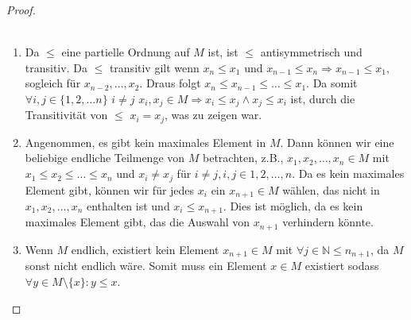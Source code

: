\documentclass{exam}
\begin{document}
\begin{proof} \\\
	\begin{enumerate}[label=\roman*)]
		\item
		      Da $\le$ eine partielle Ordnung auf $M$ ist, ist $\le$ antisymmetrisch und transitiv.
		      Da $\le$ transitiv gilt wenn $x_n \le x_1$ und $x_{n-1} \le x_n \Rightarrow x_{n-1} \le x_1$, sogleich für $x_{n-2}, \dots, x_2$.
		      Draus folgt $x_n \leq x_{n-1} \le \dots \le x_1$.
		      Da somit $\forall i,j \in \{1,2,\dots n\}$ $i \ne j$ $x_i,x_j \in M \Rightarrow x_i \le x_j \land x_j \le x_i$ ist,
		      durch die Transitivität von $\le$ $x_i = x_j$, was zu zeigen war.
		      \checkmark
		\item
		      Angenommen, es gibt kein maximales Element in $M$. Dann können wir eine beliebige endliche Teilmenge von $M$ betrachten, z.B., $x_1, x_2, \ldots, x_n \in M$ mit $x_1 \leq x_2 \leq \ldots \leq x_n$ und $x_i \neq x_j$ für $i \neq j, i, j \in {1, 2, \ldots, n}$.
		      Da es kein maximales Element gibt, können wir für jedes $x_i$ ein $x_{n+1} \in M$ wählen, das nicht in ${x_1, x_2, \ldots, x_n}$ enthalten ist und $x_i \leq x_{n+1}$. Dies ist möglich, da es kein maximales Element gibt, das die Auswahl von $x_{n+1}$ verhindern könnte.
		      \checkmark
		\item
		      Wenn $M$ endlich, existiert kein Element $x_{n+1} \in M$ mit $\forall j \in \mathbb{N} \le n_{n+1}$, da $M$ sonst nicht endlich wäre.
		      Somit muss ein Element $x \in M$ existiert sodass $\forall y \in M \setminus \{x\}: y \le x$.
		      \checkmark
	\end{enumerate}
\end{proof}

\pagebreak
\end{document}
